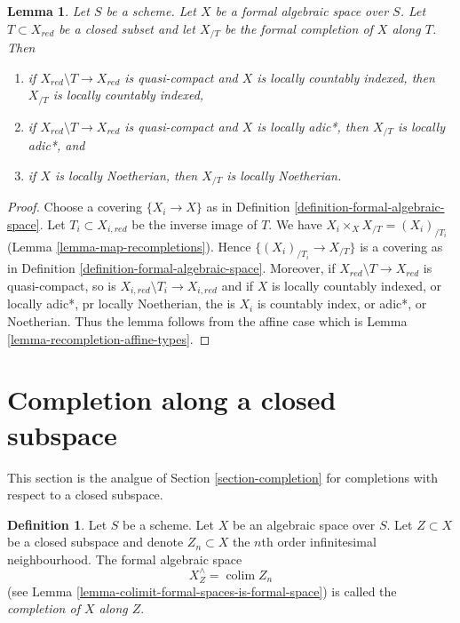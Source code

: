 \documentclass{stacks-project}
\theoremstyle{plain}
\newtheorem{lemma}[subsection]{Lemma}
\theoremstyle{definition}
\newtheorem{definition}[subsection]{Definition}
\theoremstyle{remark}
\numberwithin{equation}{subsection}
\def\colim{\mathop{\mathrm{colim}}\nolimits}
\begin{document}
\begin{lemma}
\label{lemma-recompletion-types}
Let $S$ be a scheme. Let $X$ be a formal algebraic space over $S$.
Let $T \subset X_{red}$ be a closed subset and let $X_{/T}$
be the formal completion of $X$ along $T$. Then
\begin{enumerate}
\item if $X_{red} \setminus T \to X_{red}$ is quasi-compact and $X$
is locally countably indexed, then $X_{/T}$ is locally countably indexed,
\item if $X_{red} \setminus T \to X_{red}$ is quasi-compact and $X$
is locally adic*, then $X_{/T}$ is locally adic*, and
\item if $X$ is locally Noetherian, then $X_{/T}$ is locally Noetherian.
\end{enumerate}
\end{lemma}

\begin{proof}
Choose a covering $\{X_i \to X\}$ as in
Definition \ref{definition-formal-algebraic-space}.
Let $T_i \subset X_{i, red}$ be the inverse image of $T$.
We have $X_i \times_X X_{/T} = (X_i)_{/T_i}$
(Lemma \ref{lemma-map-recompletions}).
Hence $\{(X_i)_{/T_i} \to X_{/T}\}$ is a covering as in
Definition \ref{definition-formal-algebraic-space}.
Moreover, if $X_{red} \setminus T \to X_{red}$ is quasi-compact, so is
$X_{i, red} \setminus T_i \to X_{i, red}$
and if $X$ is locally countably indexed, or locally adic*, pr
locally Noetherian, the is $X_i$ is countably index, or adic*,
or Noetherian. Thus the lemma follows from the affine case which is
Lemma \ref{lemma-recompletion-affine-types}.
\end{proof}








\section{Completion along a closed subspace}
\label{section-completion-subspace}

\noindent
This section is the analgue of Section \ref{section-completion}
for completions with respect to a closed subspace.

\begin{definition}
\label{definition-completion-subspace}
Let $S$ be a scheme. Let $X$ be an algebraic space over $S$.
Let $Z \subset X$ be a closed subspace and denote $Z_n \subset X$
the $n$th order infinitesimal neighbourhood. The formal algebraic space
$$
X^\wedge_Z = \colim Z_n
$$
(see Lemma \ref{lemma-colimit-formal-spaces-is-formal-space})
is called the {\it completion of $X$ along $Z$}.
\end{definition}
\end{document}
